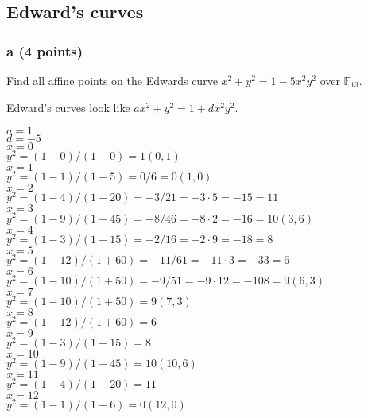 \documentclass{article}
\begin{document}
\subsection{Edward's curves}
\subsubsection{a (4 points)}
Find all affine points on the Edwards curve
$x^2 + y^2 = 1 - 5x^2y^2$ over $\mathbb{F}_{13}$.

Edward's curves look like $ax^2+y^2 = 1 + dx^2y^2$.

$a=1$ \\
$d=-5$ \\

$x = 0$ \\
$y^2 = (1-0)/(1+0) = 1                                   (0, 1)$ \\
$x = 1$ \\
$y^2 = (1-1)/(1+5) = 0/6 = 0                             (1, 0)$ \\
$x = 2$ \\
$y^2 = (1-4)/(1+20) = -3/21 = -3 \cdot 5 = -15 = 11$ \\
$x = 3$ \\
$y^2 = (1-9)/(1+45) = -8/46 = -8 \cdot 2 = -16 = 10           (3, 6)$ \\
$x = 4$ \\
$y^2 = (1-3)/(1+15) = -2/16 = -2 \cdot 9 = -18 = 8$ \\
$x = 5$ \\
$y^2 = (1-12)/(1+60) = -11/61 = -11 \cdot 3 = -33 = 6$ \\
$x = 6$ \\
$y^2 = (1-10)/(1+50) = -9/51 = -9 \cdot 12 = -108 = 9         (6, 3)$ \\
$x = 7$ \\
$y^2 = (1-10)/(1+50) = 9                                (7, 3)$ \\
$x = 8$ \\
$y^2 = (1-12)/(1+60) = 6$ \\
$x = 9$ \\
$y^2 = (1-3)/(1+15) = 8$ \\
$x = 10$ \\
$y^2 = (1-9)/(1+45) = 10                                (10, 6)$ \\
$x = 11$ \\
$y^2 = (1-4)/(1+20) = 11$ \\
$x = 12$ \\
$y^2 = (1-1)/(1+6) = 0                                  (12, 0)$ \\
\end{document}
